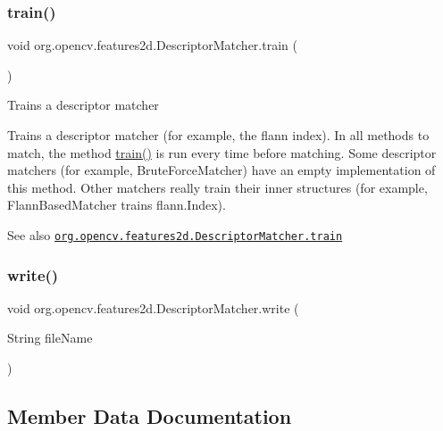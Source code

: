 \subsubsection{\texorpdfstring{train()}{train()}}
{\footnotesize\ttfamily void org.\+opencv.\+features2d.\+Descriptor\+Matcher.\+train (\begin{DoxyParamCaption}{ }\end{DoxyParamCaption})}

Trains a descriptor matcher

Trains a descriptor matcher (for example, the flann index). In all methods to match, the method {\ttfamily \mbox{\hyperlink{classorg_1_1opencv_1_1features2d_1_1_descriptor_matcher_a6c4da7f3f15fbea1000c509fec8ad1b9}{train()}}} is run every time before matching. Some descriptor matchers (for example, {\ttfamily Brute\+Force\+Matcher}) have an empty implementation of this method. Other matchers really train their inner structures (for example, {\ttfamily Flann\+Based\+Matcher} trains {\ttfamily flann.\+Index}).

\begin{DoxySeeAlso}{See also}
\href{http://docs.opencv.org/modules/features2d/doc/common_interfaces_of_descriptor_matchers.html#descriptormatcher-train}{\tt org.\+opencv.\+features2d.\+Descriptor\+Matcher.\+train} 
\end{DoxySeeAlso}
\mbox{\label{classorg_1_1opencv_1_1features2d_1_1_descriptor_matcher_a9cb97b589f0af378c86f98f2f66c9c6b}} 
\subsubsection{\texorpdfstring{write()}{write()}}
{\footnotesize\ttfamily void org.\+opencv.\+features2d.\+Descriptor\+Matcher.\+write (\begin{DoxyParamCaption}\item[{String}]{file\+Name }\end{DoxyParamCaption})}



\subsection{Member Data Documentation}
\mbox{\label{classorg_1_1opencv_1_1features2d_1_1_descriptor_matcher_ab63db8f54105cd9d4712c2fe371fa7b9}} 
